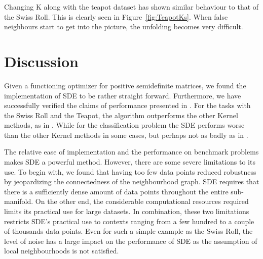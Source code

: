 \documentclass[a4paper,12pt]{article}
\begin{document}
Changing K along with the teapot dataset has shown similar behaviour to that of the Swiss Roll. This is clearly seen in Figure~\ref{fig:TeapotKs}. When false neighbours start to get into the picture, the unfolding becomes very difficult.


\section{Discussion}
\label{sec:summary}
Given a functioning optimizer for positive semidefinite matrices, we found the implementation of SDE to be rather straight forward. Furthermore, we have successfully verified the claims of performance presented in \cite{weinberger04}. For the tasks with the Swiss Roll and the Teapot, the algorithm outperforms the other Kernel methods, as in \cite{weinberger04}. While for the classification problem the SDE performs worse than the other Kernel methods in some cases, but perhaps not as badly as in \cite{weinberger04}.  

The relative ease of implementation and the performance on benchmark problems makes SDE a powerful method. However, there are some severe limitations to its use. To begin with, we found that having too few data points reduced robustness by jeopardizing the connectedness of the neighbourhood graph. SDE requires that there is a sufficiently dense amount of data points throughout the entire sub-manifold. On the other end, the considerable computational resources required limits its practical use for large datasets. In combination, these two limitations restricts SDE's practical use to contexts ranging from a few hundred to a couple of thousands data points. Even for such a simple example as the Swiss Roll, the level of noise has a large impact on the performance of SDE as the assumption of local neighbourhoods is not satisfied.

\end{document}
